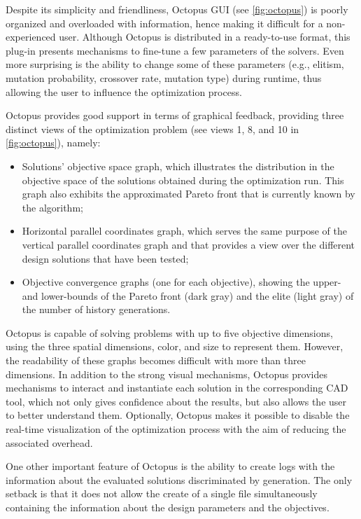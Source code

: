 	Despite its simplicity and friendliness, Octopus \ac{GUI} (see \cref{fig:octopus}) is poorly organized and overloaded with information, hence making it difficult for a non-experienced user. Although Octopus is distributed in a ready-to-use format, this plug-in presents mechanisms to fine-tune a few parameters of the solvers. Even more surprising is the ability to change some of these parameters (e.g., elitism, mutation probability, crossover rate, mutation type) during runtime, thus allowing the user to influence the optimization process.
	
	Octopus provides good support in terms of graphical feedback, providing three distinct views of the optimization problem (see views 1, 8, and 10 in \cref{fig:octopus}), namely:
	\begin{itemize}
		\item Solutions' objective space graph, which illustrates the distribution in the objective space of the solutions obtained during the optimization run. This graph also exhibits the approximated Pareto front that is currently known by the algorithm;
		\item Horizontal parallel coordinates graph, which serves the same purpose of the vertical parallel coordinates graph and that provides a view over the different design solutions that have been tested;
		\item Objective convergence graphs (one for each objective), showing the upper- and lower-bounds of the Pareto front (dark gray) and the elite (light gray) of the number of history generations.
	\end{itemize} 
	
	Octopus is capable of solving problems with up to five objective dimensions, using the three spatial dimensions, color, and size to represent them. However, the readability of these graphs becomes difficult with more than three dimensions. In addition to the strong visual mechanisms, Octopus provides mechanisms to interact and instantiate each solution in the corresponding \ac{CAD} tool, which not only gives confidence about the results, but also allows the user to better understand them. Optionally, Octopus makes it possible to disable the real-time visualization of the optimization process with the aim of reducing the associated overhead.
	
	One other important feature of Octopus is the ability to create logs with the information about the evaluated solutions discriminated by generation. The only setback is that it does not allow the create of a single file simultaneously containing the information about the design parameters and the objectives. 
	
